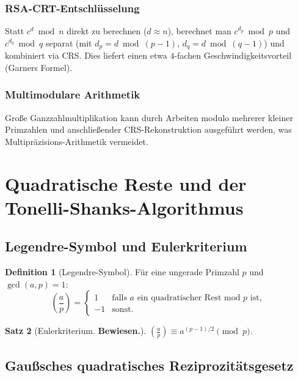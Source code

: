 \documentclass[12pt,a4paper]{amsart}
\newtheorem{theorem}{Satz}[section]
\theoremstyle{definition}
\newtheorem{definition}[theorem]{Definition}
\begin{document}
\subsubsection*{RSA-CRT-Entschlüsselung}

Statt $c^d \bmod n$ direkt zu berechnen ($d \approx n$), berechnet man
$c^{d_p} \bmod p$ und $c^{d_q} \bmod q$ separat
(mit $d_p = d \bmod (p-1)$, $d_q = d \bmod (q-1)$) und kombiniert via CRS.
Dies liefert einen etwa $4$-fachen Geschwindigkeitsvorteil (Garners Formel).

\subsubsection*{Multimodulare Arithmetik}

Große Ganzzahlmultiplikation kann durch Arbeiten modulo mehrerer kleiner
Primzahlen und anschließender CRS-Rekonstruktion ausgeführt werden, was
Multipräzisions-Arithmetik vermeidet.

\section{Quadratische Reste und der Tonelli-Shanks-Algorithmus}

\subsection{Legendre-Symbol und Eulerkriterium}

\begin{definition}[Legendre-Symbol]
Für eine ungerade Primzahl $p$ und $\gcd(a,p)=1$:
\[
  \left(\frac{a}{p}\right) =
  \begin{cases} 1 & \text{falls } a \text{ ein quadratischer Rest mod } p \text{ ist},\\
                -1 & \text{sonst.}
  \end{cases}
\]
\end{definition}

\begin{theorem}[Eulerkriterium. \textbf{Bewiesen.}]
$\left(\frac{a}{p}\right) \equiv a^{(p-1)/2} \pmod{p}$.
\end{theorem}

\subsection{Gaußsches quadratisches Reziprozitätsgesetz}
\end{document}
